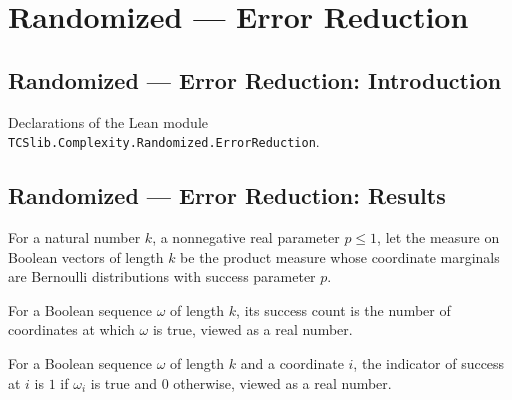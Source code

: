 \section{Randomized --- Error Reduction}
\subsection*{Randomized --- Error Reduction: Introduction}

Declarations of the Lean module \texttt{TCSlib.Complexity.Randomized.ErrorReduction}.

\subsection*{Randomized --- Error Reduction: Results}

\begin{definition}
\label{Randomized.iidBernoulli}
\leanok
For a natural number $k$, a nonnegative real parameter $p\leq 1$, let the measure on
Boolean vectors of length $k$ be the product measure whose coordinate marginals are
Bernoulli distributions with success parameter $p$.
\end{definition}

\begin{definition}
\label{Randomized.successCount}
\leanok
For a Boolean sequence $\omega$ of length $k$, its success count is the number of
coordinates at which $\omega$ is true, viewed as a real number.
\end{definition}

\begin{definition}
\label{Randomized.coordIndicator}
\leanok
For a Boolean sequence $\omega$ of length $k$ and a coordinate $i$, the indicator of
success at $i$ is $1$ if $\omega_i$ is true and $0$ otherwise, viewed as a real number.
\end{definition}

